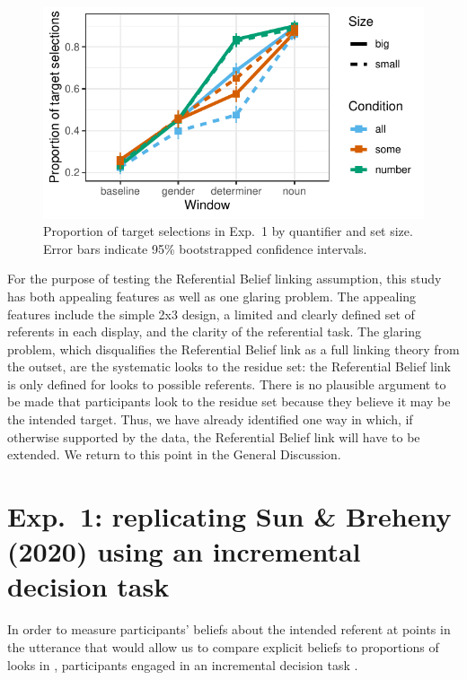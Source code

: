 \documentclass[10pt,letterpaper]{article}
\newcommand{\expref}[1]{Exp.~#1}
\begin{document}
\begin{figure}[tbh!]
\centering
\includegraphics[width=\columnwidth]{../../analysis/SunBreheny/1_incremental/main/graphs/results-target-all-looks}
\caption{Proportion of target selections in \expref{1} by quantifier and set size. Error bars indicate 95\% bootstrapped confidence intervals.} 
\label{fig:results-idt}
\end{figure}


For the purpose of testing the Referential Belief linking assumption, this study has both appealing features as well as one glaring problem. The appealing features include the simple 2x3 design, a limited and clearly defined set of referents in each display, and the clarity of the referential task. The glaring problem, which disqualifies the Referential Belief link as a full linking theory from the outset, are the systematic looks to the residue set: the Referential Belief link is only defined for looks to possible referents. There is no plausible argument to be made that participants look to the residue set because they believe it may be the intended target.  Thus, we have already identified one way in which, if otherwise supported by the data, the Referential Belief link will have to be extended. We return to this point in the General Discussion.


\section{Exp.~1: replicating Sun \& Breheny (2020) using an incremental decision task}

In order to measure participants' beliefs about the intended referent at points in the utterance that would allow us to compare explicit beliefs to proportions of looks in , participants engaged in an incremental decision task \cite{Allopenna1998,QingLD2018, KreissDegen2020,alsop2018}. 
\end{document}

